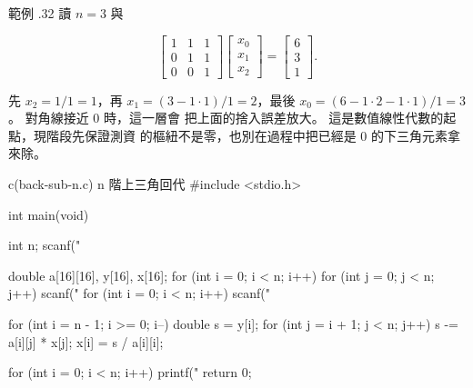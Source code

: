 範例 \thechapter.32 讀 $n=3$ 與

\[
\begin{bmatrix}
1 & 1 & 1 \\
0 & 1 & 1 \\
0 & 0 & 1
\end{bmatrix}
\begin{bmatrix} x_0 \\ x_1 \\ x_2 \end{bmatrix}
=
\begin{bmatrix} 6 \\ 3 \\ 1 \end{bmatrix}.
\]

先 $x_2 = 1/1 = 1$，再 $x_1 = (3-1\cdot 1)/1 = 2$，最後
$x_0 = (6-1\cdot 2-1\cdot 1)/1 = 3$。 對角線接近 $0$ 時，這一層會
把上面的捨入誤差放大。 這是數值線性代數的起點，現階段先保證測資
的樞紐不是零，也別在過程中把已經是 $0$ 的下三角元素拿來除。

\begin{example}{c}{(back-sub-n.c) n 階上三角回代}
#include <stdio.h>

int main(void) {
    int n;
    scanf("%

    double a[16][16], y[16], x[16];
    for (int i = 0; i < n; i++) {
        for (int j = 0; j < n; j++) {
            scanf("%
        }
    }
    for (int i = 0; i < n; i++) {
        scanf("%
    }

    for (int i = n - 1; i >= 0; i--) {
        double s = y[i];
        for (int j = i + 1; j < n; j++) {
            s -= a[i][j] * x[j];
        }
        x[i] = s / a[i][i];
    }

    for (int i = 0; i < n; i++) {
        printf("%
    }
    return 0;
}
\end{example}



